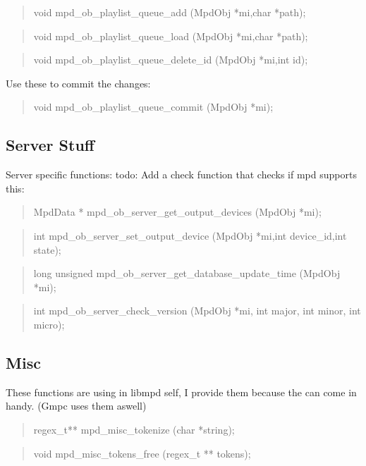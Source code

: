 \documentclass[a4paper,11pt]{article}
\begin{document}
	\begin{quote}
	void 		mpd\_ob\_playlist\_queue\_add		(MpdObj *mi,char *path);
	\end{quote}
	
	\begin{quote}
	void 		mpd\_ob\_playlist\_queue\_load		(MpdObj *mi,char *path);
	\end{quote}
	\begin{quote}
	void 		mpd\_ob\_playlist\_queue\_delete\_id		(MpdObj *mi,int id);
	\end{quote}
	
	Use these to commit the changes:
	\begin{quote}
	void 		mpd\_ob\_playlist\_queue\_commit		(MpdObj *mi);
	\end{quote}
	
	\subsection{Server Stuff}
	
	Server specific functions:
	todo: Add a check function that checks if mpd supports this:
	\begin{quote}
	MpdData * 	mpd\_ob\_server\_get\_output\_devices	(MpdObj *mi);
	\end{quote}
	
	\begin{quote}
	int 		mpd\_ob\_server\_set\_output\_device		(MpdObj *mi,int device\_id,int state);
	\end{quote}
	\begin{quote}
	long unsigned	mpd\_ob\_server\_get\_database\_update\_time	(MpdObj *mi);
	\end{quote}
	\begin{quote}
	int 		mpd\_ob\_server\_check\_version		(MpdObj *mi, int major, int minor, int micro);
	\end{quote}
	
	\subsection{Misc}
	
	
	These functions are using in libmpd self, I provide them because the can come in handy.
	(Gmpc uses them aswell)
	
	\begin{quote}
	regex\_t** 	mpd\_misc\_tokenize			(char *string);
	\end{quote}
	
	\begin{quote}
	void 		mpd\_misc\_tokens\_free			(regex\_t ** tokens);
	\end{quote}
\end{document}
